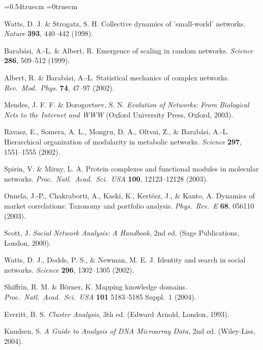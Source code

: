 \documentclass[11pt,a4paper]{article}
\begin{document}
\begin{thebibliography}{99}

\baselineskip=0.54truecm \parskip=0truecm

Watts, D. J. \& Strogatz, S. H.
Collective dynamics of 'small-world' networks.
\textit{Nature} \textbf{393}, 440--442 (1998).

Barab{\'a}si, A.-L. \& Albert, R.
Emergence of scaling in random networks.
\textit{Science} \textbf{286}, 509--512 (1999).

Albert, R. \& Barab{\'a}si, A.-L.
Statistical mechanics of complex networks.
\textit{Rev.\ Mod.\ Phys.} \textbf{74}, 47--97 (2002).

Mendes, J. F. F. \& Dorogovtsev, S. N.
%
\textit{Evolution of Networks: From Biological Nets to the Internet and WWW}
(Oxford University Press, Oxford, 2003).

Ravasz, E., Somera, A. L., Mongru, D. A., Oltvai, Z., \& Barab{\'a}si, A.-L.
Hierarchical organization of modularity in metabolic networks.
\textit{Science} \textbf{297}, 1551--1555 (2002).

Spirin, V. \& Mirny, L. A.
Protein complexes and functional modules in molecular networks.
\textit{Proc.\ Natl.\ Acad.\ Sci.\ USA} \textbf{100}, 12123--12128 (2003).

Onnela, J.-P., Chakraborti, A., Kaski, K., Kert{\'e}sz, J., \& Kanto, A.
Dynamics of market correlations: Taxonomy and portfolio analysis.
\textit{Phys.\ Rev.\ E} \textbf{68}, 056110 (2003).

Scott, J.
%
\textit{Social Network Analysis: A Handbook}, 2nd ed.
(Sage Publications, London, 2000).

Watts, D. J., Dodds, P. S., \& Newman, M. E. J.
Identity and search in social networks.
\textit{Science} \textbf{296}, 1302--1305 (2002).

Shiffrin, R. M. \& B{\"o}rner, K.
Mapping knowledge domains.
\textit{Proc.\ Natl.\ Acad.\ Sci.\ USA} \textbf{101} 5183--5185
 Suppl.\ 1 (2004).

Everitt, B. S.
%
\textit{Cluster Analysis}, 3th ed.
(Edward Arnold, London, 1993).

Knudsen, S.
%
\textit{A Guide to Analysis of DNA Microarray Data}, 2nd ed.
(Wiley-Liss, 2004).


\end{thebibliography}
\end{document}

